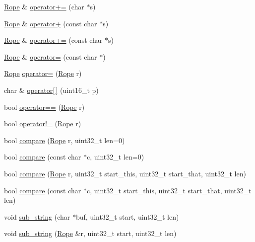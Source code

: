 \begin{DoxyCompactItemize}
\item 
\hyperlink{classetk_1_1_rope}{Rope} \& \hyperlink{classetk_1_1_rope_abc09dbcfff3c4831b69b34fe7104d69a}{operator+=} (char $\ast$s)
\item 
\hyperlink{classetk_1_1_rope}{Rope} \& \hyperlink{classetk_1_1_rope_ad77d08a34d58cd32a77c5892ba08066b}{operator+} (const char $\ast$s)
\item 
\hyperlink{classetk_1_1_rope}{Rope} \& \hyperlink{classetk_1_1_rope_a45fc4662e4a597f6f36ea28bb6f06cb5}{operator+=} (const char $\ast$s)
\item 
\hyperlink{classetk_1_1_rope}{Rope} \& \hyperlink{classetk_1_1_rope_a1c941bf7b2384deec0944112302ae8b7}{operator=} (const char $\ast$)
\item 
\hyperlink{classetk_1_1_rope}{Rope} \hyperlink{classetk_1_1_rope_a4b3bf55db6c26dc23ed591109a8630ac}{operator=} (\hyperlink{classetk_1_1_rope}{Rope} r)
\item 
char \& \hyperlink{classetk_1_1_rope_a24a722f247acaa54c9722f25499fa10d}{operator\mbox{[}$\,$\mbox{]}} (uint16\-\_\-t p)
\item 
bool \hyperlink{classetk_1_1_rope_aa4d21033ec629f96267a1379c09f1774}{operator==} (\hyperlink{classetk_1_1_rope}{Rope} r)
\item 
bool \hyperlink{classetk_1_1_rope_aa8d24103adf48f0637a847dd8a893620}{operator!=} (\hyperlink{classetk_1_1_rope}{Rope} r)
\item 
bool \hyperlink{classetk_1_1_rope_a40abfca1b1c39b13e1ed496b9ddd9bc2}{compare} (\hyperlink{classetk_1_1_rope}{Rope} r, uint32\-\_\-t len=0)
\item 
bool \hyperlink{classetk_1_1_rope_a3defb701a1863f058816b6ce69d7dd2b}{compare} (const char $\ast$c, uint32\-\_\-t len=0)
\item 
bool \hyperlink{classetk_1_1_rope_af3c0a81deb000d389a2b419b177dbb24}{compare} (\hyperlink{classetk_1_1_rope}{Rope} r, uint32\-\_\-t start\-\_\-this, uint32\-\_\-t start\-\_\-that, uint32\-\_\-t len)
\item 
bool \hyperlink{classetk_1_1_rope_af9c3867162a199542649975cd03ef19b}{compare} (const char $\ast$c, uint32\-\_\-t start\-\_\-this, uint32\-\_\-t start\-\_\-that, uint32\-\_\-t len)
\item 
void \hyperlink{classetk_1_1_rope_a7ef95f2df5fe32f8c0cf78d045c646e1}{sub\-\_\-string} (char $\ast$buf, uint32\-\_\-t start, uint32\-\_\-t len)
\item 
void \hyperlink{classetk_1_1_rope_acbb152dcf1b0bddbcfd45bb159720d7b}{sub\-\_\-string} (\hyperlink{classetk_1_1_rope}{Rope} \&r, uint32\-\_\-t start, uint32\-\_\-t len)

\end{DoxyCompactItemize}
